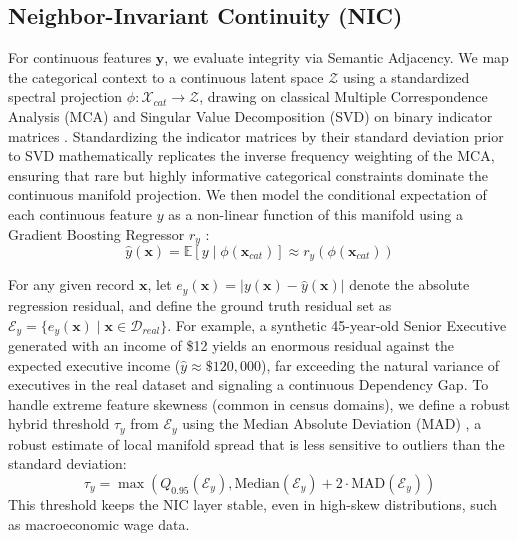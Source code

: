 \documentclass[pdflatex,sn-mathphys-num]{sn-jnl}
\theoremstyle{thmstyleone}%
\theoremstyle{thmstyletwo}%
\theoremstyle{thmstylethree}%
\begin{document}
\subsection{Neighbor-Invariant Continuity (NIC)}

For continuous features $\mathbf{y}$, we evaluate integrity via Semantic Adjacency. We map the categorical context to a continuous latent space $\mathcal{Z}$ using a standardized spectral projection $\phi: \mathcal{X}_{cat} \to \mathcal{Z}$, drawing on classical Multiple Correspondence Analysis (MCA) and Singular Value Decomposition (SVD) on binary indicator matrices \cite{abdi2010principal, greenacre2007correspondence}. Standardizing the indicator matrices by their standard deviation prior to SVD mathematically replicates the inverse frequency weighting of the MCA, ensuring that rare but highly informative categorical constraints dominate the continuous manifold projection. We then model the conditional expectation of each continuous feature $y$ as a non-linear function of this manifold using a Gradient Boosting Regressor $r_y$ \cite{friedman2001greedy, ke2017lightgbm}:
\begin{equation}
    \hat{y}(\mathbf{x}) = \mathbb{E}[y \mid \phi(\mathbf{x}_{cat})] \approx r_y(\phi(\mathbf{x}_{cat}))
\end{equation}

For any given record $\mathbf{x}$, let $e_y(\mathbf{x}) = |y(\mathbf{x}) - \hat{y}(\mathbf{x})|$ denote the absolute regression residual, and define the ground truth residual set as $\mathcal{E}_y = \{ e_y(\mathbf{x}) \mid \mathbf{x} \in \mathcal{D}_{real} \}$. For example, a synthetic 45-year-old Senior Executive generated with an income of \$12 yields an enormous residual against the expected executive income ($\hat{y} \approx \$120{,}000$), far exceeding the natural variance of executives in the real dataset and signaling a continuous Dependency Gap. To handle extreme feature skewness (common in census domains), we define a robust hybrid threshold $\tau_y$ from $\mathcal{E}_y$ using the Median Absolute Deviation (MAD) \cite{tukey1977exploratory}, a robust estimate of local manifold spread that is less sensitive to outliers than the standard deviation:
\begin{equation}
    \tau_y = \max \left( Q_{0.95}(\mathcal{E}_y), \text{Median}(\mathcal{E}_y) + 2 \cdot \text{MAD}(\mathcal{E}_y) \right)
\end{equation}
This threshold keeps the NIC layer stable, even in high-skew distributions, such as macroeconomic wage data.
\end{document}
